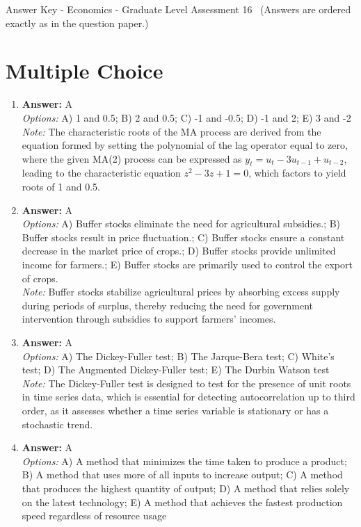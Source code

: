 \documentclass[12pt]{article}
\begin{document}
\begin{center}
Answer Key - Economics - Graduate Level Assessment 16 \
\small (Answers are ordered exactly as in the question paper.)
\end{center}

\section*{Multiple Choice}
\begin{enumerate}[label=\arabic*.]
\item \textbf{Answer:} A
\\ \textit{Options:} A) 1 and 0.5; B) 2 and 0.5; C) -1 and -0.5; D) -1 and 2; E) 3 and -2
\\ \textit{Note:} The characteristic roots of the MA process are derived from the equation formed by setting the polynomial of the lag operator equal to zero, where the given MA(2) process can be expressed as \( y_t = u_t - 3 u_{t-1} + u_{t-2} \), leading to the characteristic equation \( z^2 - 3 z + 1 = 0 \), which factors to yield roots of 1 and 0.5.
\item \textbf{Answer:} A
\\ \textit{Options:} A) Buffer stocks eliminate the need for agricultural subsidies.; B) Buffer stocks result in price fluctuation.; C) Buffer stocks ensure a constant decrease in the market price of crops.; D) Buffer stocks provide unlimited income for farmers.; E) Buffer stocks are primarily used to control the export of crops.
\\ \textit{Note:} Buffer stocks stabilize agricultural prices by absorbing excess supply during periods of surplus, thereby reducing the need for government intervention through subsidies to support farmers' incomes.
\item \textbf{Answer:} A
\\ \textit{Options:} A) The Dickey-Fuller test; B) The Jarque-Bera test; C) White's test; D) The Augmented Dickey-Fuller test; E) The Durbin Watson test
\\ \textit{Note:} The Dickey-Fuller test is designed to test for the presence of unit roots in time series data, which is essential for detecting autocorrelation up to third order, as it assesses whether a time series variable is stationary or has a stochastic trend.
\item \textbf{Answer:} A
\\ \textit{Options:} A) A method that minimizes the time taken to produce a product; B) A method that uses more of all inputs to increase output; C) A method that produces the highest quantity of output; D) A method that relies solely on the latest technology; E) A method that achieves the fastest production speed regardless of resource usage

\end{enumerate}
\end{document}
